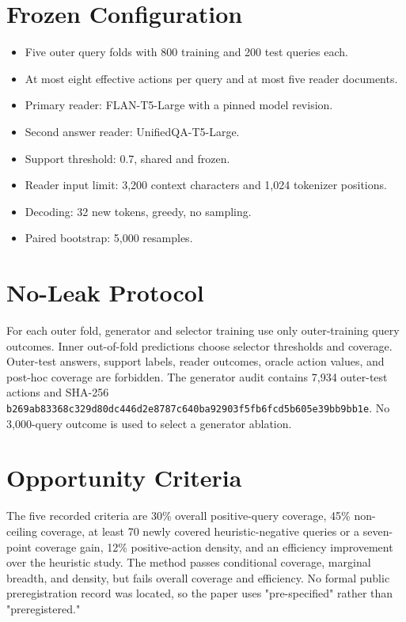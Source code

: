 \section{Frozen Configuration}

\begin{itemize}
\item Five outer query folds with 800 training and 200 test queries each.
\item At most eight effective actions per query and at most five reader documents.
\item Primary reader: FLAN-T5-Large with a pinned model revision.
\item Second answer reader: UnifiedQA-T5-Large.
\item Support threshold: 0.7, shared and frozen.
\item Reader input limit: 3,200 context characters and 1,024 tokenizer positions.
\item Decoding: 32 new tokens, greedy, no sampling.
\item Paired bootstrap: 5,000 resamples.
\end{itemize}

\section{No-Leak Protocol}

For each outer fold, generator and selector training use only outer-training query outcomes. Inner out-of-fold predictions choose selector thresholds and coverage. Outer-test answers, support labels, reader outcomes, oracle action values, and post-hoc coverage are forbidden. The generator audit contains 7,934 outer-test actions and SHA-256 \nolinkurl{b269ab83368c329d80dc446d2e8787c640ba92903f5fb6fcd5b605e39bb9bb1e}. No 3,000-query outcome is used to select a generator ablation.

\section{Opportunity Criteria}

The five recorded criteria are 30\% overall positive-query coverage, 45\% non-ceiling coverage, at least 70 newly covered heuristic-negative queries or a seven-point coverage gain, 12\% positive-action density, and an efficiency improvement over the heuristic study. The method passes conditional coverage, marginal breadth, and density, but fails overall coverage and efficiency. No formal public preregistration record was located, so the paper uses "pre-specified" rather than "preregistered."

